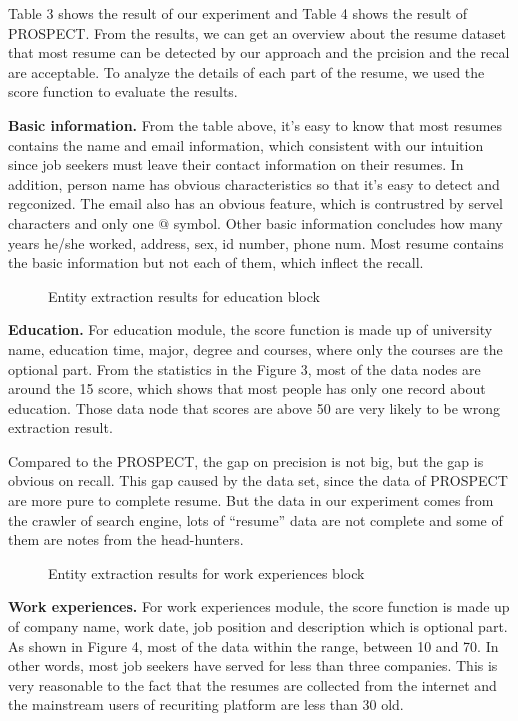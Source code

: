 \documentclass{acm_proc_article-sp}
\begin{document}
Table 3 shows the result of our experiment and Table 4 shows the result of PROSPECT.
From the results, we can get an overview about the resume dataset that most resume can be detected by our approach and the prcision and the recal are acceptable.
To analyze the details of each part of the resume, we used the score function to evaluate the results.

\textbf{Basic information.}
From the table above, it's easy to know that most resumes contains the name and email information, which consistent with our intuition since job seekers must leave their contact information on their resumes.
In addition, person name has obvious characteristics so that it's easy to detect and regconized.
The email also has an obvious feature, which is contrustred by servel characters and only one $@$ symbol.
Other basic information concludes how many years he/she worked, address, sex, id number, phone num.
Most resume contains the basic information but not each of them, which inflect the recall.


\begin{figure}\label{edu-scores}
\centering
{}
\caption{Entity extraction results for education block}
\end{figure}

\textbf{Education.} 
For education module, the score function is made up of university name, education time, major, degree and courses, where only the courses are the optional part.
From the statistics in the Figure 3, most of the data nodes are around the 15 score, which shows that most people has only one record about education. 
Those data node that scores are above 50 are very likely to be wrong extraction result.

Compared to the PROSPECT, the gap on precision is not big, but the gap is obvious on recall.
This gap caused by the data set, since the data of 	PROSPECT are more pure to complete resume. 
But the data in our experiment comes from the crawler of search engine, lots of ``resume'' data are not complete and some of them are notes from the head-hunters.

\begin{figure}\label{wk-scores}
\centering
{}
\caption{Entity extraction results for work experiences block}
\end{figure}

\textbf{Work experiences.}
For work experiences module, the score function is made up of company name, work date, job position and description which is optional part.
As shown in Figure 4, most of the data within the range, between 10 and 70.
In other words, most job seekers have served for less than three companies.
This is very reasonable to the fact that the resumes are collected from the internet and the mainstream users of recuriting platform are less than 30 old.
\end{document}
